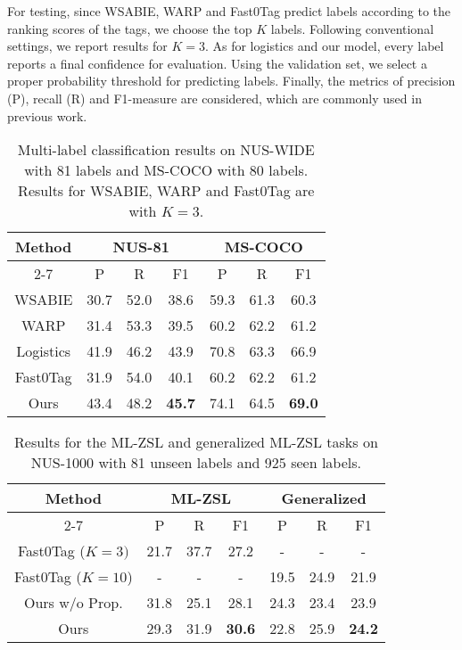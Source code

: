 \documentclass[10pt,twocolumn,letterpaper]{article}
\begin{document}
For testing, since WSABIE, WARP and Fast0Tag predict labels according to the ranking scores of the tags, we choose the top $K$ labels. Following conventional settings, we report results for $K=3$. As for logistics and our model, every label reports a final confidence for evaluation. Using the validation set, we select a proper probability threshold for predicting labels. Finally,
the metrics of precision (P), recall (R) and F1-measure are considered, which are commonly used in previous work.

\begin{table}
\small
\centering
  	\begin{tabular}{|c|ccc|ccc|}
           \multirow{3}{*}{Method}& \multicolumn{3}{c|}{NUS-81} & \multicolumn{3}{c|}{MS-COCO} \\ 
           \cline{2-7}
           & P & R & F1 & P & R & F1 \\
          \hline
          WSABIE & 30.7& 52.0& 38.6 & 59.3 & 61.3 & 60.3   \\
          WARP & 31.4 & 53.3 & 39.5 &  60.2 & 62.2 & 61.2 \\
          Logistics &41.9& 46.2& 43.9 & 70.8 & 63.3 & 66.9  \\  
          Fast0Tag & 31.9& 54.0& 40.1 & 60.2 & 62.2 & 61.2 \\
          Ours & 43.4& 48.2 & {\bf 45.7} & 74.1 & 64.5 & {\bf 69.0} \\
      \end{tabular}
      \vspace{1.5em}
      \caption{Multi-label classification results on NUS-WIDE with 81 labels and MS-COCO with 80 labels. Results for WSABIE, WARP and Fast0Tag are with $K=3$.}
      \label{tb:ml}
\end{table}\begin{table}[t]
	\small
	\centering
  	\begin{tabular}{|c|ccc|ccc|}
           \multirow{3}{*}{Method}& \multicolumn{3}{c|}{ML-ZSL} & \multicolumn{3}{c|}{Generalized} \\
           \cline{2-7}
           & P & R & F1 & P & R & F1\\
          \hline
           Fast0Tag ($K=3)$& 21.7 & 37.7& 27.2 & -& -& - \\
          Fast0Tag ($K=10$)& - & - & -&19.5 & 24.9&21.9 \\
          Ours w/o Prop. & 31.8& 25.1& 28.1& 24.3& 23.4& 23.9 \\
          Ours &29.3& 31.9 & {\bf 30.6} & 22.8& 25.9 & {\bf 24.2} \\
          
      \end{tabular}
      \vspace{1.5em}
      \caption{Results for the ML-ZSL and generalized ML-ZSL tasks on NUS-1000 with 81 unseen labels and 925 seen labels.}
      \label{tb:mlzsl}
\end{table}
\end{document}
